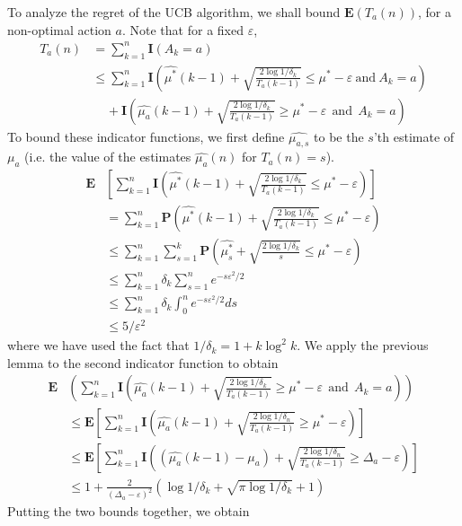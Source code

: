 To analyze the regret of the UCB algorithm, we shall bound $\mathbf{E}(T_a(n))$, for a non-optimal action $a$. Note that for a fixed $\varepsilon$,
%
\begin{align*}
    T_a(n) &= \sum_{k = 1}^n \mathbf{I}(A_k = a)\\
    &\leq \sum_{k = 1}^n \mathbf{I} \left(\widehat{\mu^*}(k-1) + \sqrt{\frac{2 \log 1/\delta_k}{T_a(k-1)}} \leq \mu^* - \varepsilon\ \text{and}\ A_k = a \right)\\
    &\ \ \ \ \ + \mathbf{I} \left(\widehat{\mu_a}(k-1) + \sqrt{\frac{2 \log 1/\delta_k}{T_a(k-1)}} \geq \mu^* - \varepsilon\ \ \text{and}\ \ A_k = a \right)
\end{align*}
%
To bound these indicator functions, we first define $\widehat{\mu_{a,s}}$ to be the $s$'th estimate of $\mu_a$ (i.e. the value of the estimates $\widehat{\mu_a}(n)$ for $T_a(n) = s$).
%
\begin{align*}
    \mathbf{E}& \left[ \sum_{k = 1}^n \mathbf{I} \left(\widehat{\mu^*}(k-1) + \sqrt{\frac{2 \log 1/\delta_k}{T_a(k-1)}} \leq \mu^* - \varepsilon \right) \right]\\
    &= \sum_{k = 1}^n \mathbf{P}\left(\widehat{\mu^*}(k-1) + \sqrt{\frac{2 \log 1/\delta_k}{T_a(k-1)}} \leq \mu^* - \varepsilon \right)\\
    &\leq \sum_{k = 1}^n \sum_{s = 1}^k \mathbf{P}\left( \widehat{\mu^*_s} + \sqrt{\frac{2 \log 1/\delta_k}{s}} \leq \mu^* - \varepsilon \right)\\
    &\leq \sum_{k = 1}^n \delta_k \sum_{s = 1}^n e^{-s\varepsilon^2/2}\\
    &\leq \sum_{k = 1}^n \delta_k \int_0^n e^{-s \varepsilon^2/2} ds\\
    &\leq 5/\varepsilon^2
\end{align*}
%
where we have used the fact that $1/\delta_k = 1 + k \log^2 k$. We apply the previous lemma to the second indicator function to obtain
%
\begin{align*}
    \mathbf{E}& \left( \sum_{k = 1}^n \mathbf{I} \left(\widehat{\mu_a}(k-1) + \sqrt{\frac{2 \log 1/\delta_k}{T_a(k-1)}} \geq \mu^* - \varepsilon\ \ \text{and}\ \ A_k = a \right) \right)\\
    &\leq \mathbf{E} \left[ \sum_{k = 1}^n \mathbf{I}(\widehat{\mu_a}(k-1) + \sqrt{\frac{2 \log 1/\delta_n}{T_a(k-1)}} \geq \mu^* - \varepsilon) \right]\\
    &\leq \mathbf{E} \left[ \sum_{k = 1}^n \mathbf{I}((\widehat{\mu_a}(k-1) - \mu_a) + \sqrt{\frac{2 \log 1/\delta_n}{T_a(k-1)}} \geq \Delta_a - \varepsilon) \right]\\
    &\leq 1 + \frac{2}{(\Delta_a - \varepsilon)^2} \left( \log 1/\delta_k + \sqrt{\pi \log 1/\delta_k} + 1 \right)
\end{align*}
%
Putting the two bounds together, we obtain

